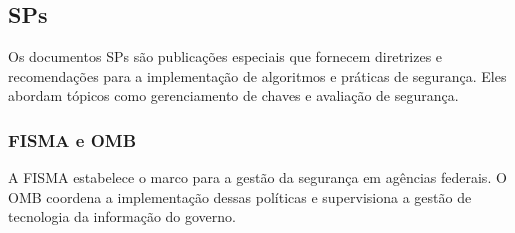     \subsection{SPs}
        Os documentos SPs são publicações especiais que fornecem diretrizes e recomendações para a implementação de algoritmos e práticas de segurança\cite{nistIR7977}. Eles abordam tópicos como gerenciamento de chaves e avaliação de segurança\cite{nistIR7977}.

        \subsubsection{FISMA e OMB}
            A FISMA estabelece o marco para a gestão da segurança em agências federais\cite{nistIR7977}. O OMB coordena a implementação dessas políticas e supervisiona a gestão de tecnologia da informação do governo\cite{nistIR7977}.


